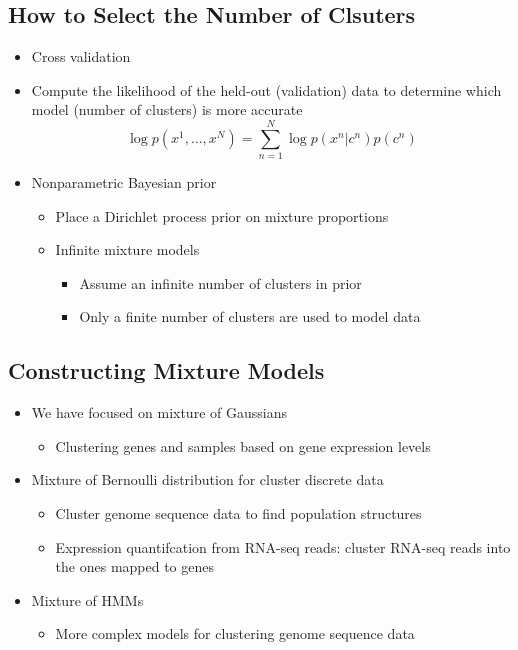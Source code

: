 \documentclass[10pt]{article}
\begin{document}
\subsection*{How to Select the Number of Clsuters}
\begin{itemize}
	\item Cross validation
	\item Compute the likelihood of the held-out (validation) data to determine which model (number of clusters) is more accurate
	\[\log p(x^1, \dots, x^N) = \sum_{n = 1}^N \log p(x^n | c^n) p(c^n)\]
    \item Nonparametric Bayesian prior
    \begin{itemize}
	    \item Place a Dirichlet process prior on mixture proportions
	    \item Infinite mixture models
	    \begin{itemize}
	        \item Assume an infinite number of clusters in prior
	        \item Only a finite number of clusters are used to model data
        \end{itemize}
    \end{itemize}
\end{itemize}

\subsection*{Constructing Mixture Models}
\begin{itemize}
	\item We have focused on mixture of Gaussians
	\begin{itemize}
	    \item Clustering genes and samples based on gene expression levels
    \end{itemize}
	\item Mixture of Bernoulli distribution for cluster discrete data
	\begin{itemize}
	    \item Cluster genome sequence data to find population structures
	    \item Expression quantifcation from RNA-seq reads: cluster RNA-seq reads into the ones mapped to genes
    \end{itemize}
	\item Mixture of HMMs
	\begin{itemize}
	    \item More complex models for clustering genome sequence data
    \end{itemize}
\end{itemize}
\end{document}
